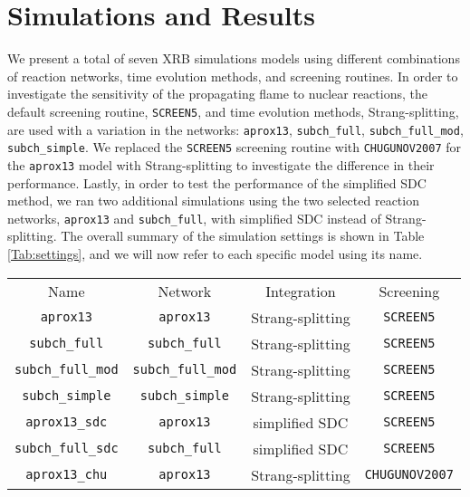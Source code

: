\documentclass[preprint,times,tighten]{aastex631}
\begin{document}
\section{Simulations and Results}\label{Sec:results}

We present a total of seven XRB simulations models using different combinations of reaction networks, time evolution methods, and screening routines. In order to investigate the sensitivity of the propagating flame to nuclear reactions, the default screening routine, {\tt SCREEN5}, and time evolution methods, Strang-splitting, are used with a variation in the networks: {\tt aprox13}, {\tt subch\_full}, {\tt subch\_full\_mod}, {\tt subch\_simple}. We replaced the {\tt SCREEN5} screening routine with {\tt CHUGUNOV2007} for the {\tt aprox13} model with Strang-splitting to investigate the difference in their performance. Lastly, in order to test the performance of the simplified SDC method, we ran two additional simulations using the two selected reaction networks, {\tt aprox13} and {\tt subch\_full}, with simplified SDC instead of Strang-splitting. The overall summary of the simulation settings is shown in Table \ref{Tab:settings}, and we will now refer to each specific model using its name.


\begin{table*}
\caption{\label{Tab:settings}
Various settings used for each simulation.
}
\begin{ruledtabular}
\begin{tabular}{cccc}
Name &
Network &
Integration &
Screening
\\ 

\colrule

{\tt aprox13} & {\tt aprox13} & Strang-splitting & {\tt SCREEN5} \\
{\tt subch\_full} & {\tt subch\_full} & Strang-splitting & {\tt SCREEN5} \\
{\tt subch\_full\_mod} & {\tt subch\_full\_mod} & Strang-splitting & {\tt SCREEN5} \\
{\tt subch\_simple} & {\tt subch\_simple} & Strang-splitting & {\tt SCREEN5} \\
{\tt aprox13\_sdc} & {\tt aprox13} & simplified SDC & {\tt SCREEN5} \\
{\tt subch\_full\_sdc} & {\tt subch\_full} & simplified SDC & {\tt SCREEN5} \\
{\tt aprox13\_chu} & {\tt aprox13} & Strang-splitting & {\tt CHUGUNOV2007} 

\end{tabular}
\end{ruledtabular}
\end{table*}
\end{document}
